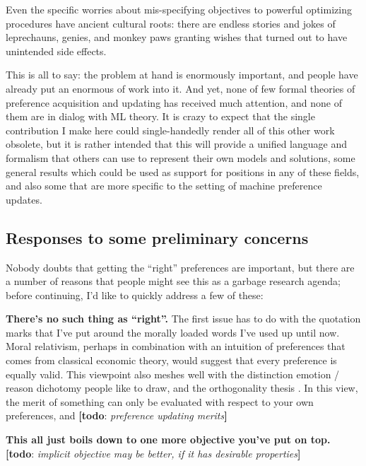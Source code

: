 \documentclass{article}
\theoremstyle{plain}
\theoremstyle{definition}
\theoremstyle{remark}
\newcommand{\todo}[1]{{\color{red}\large\textbf{[todo}: {\normalsize\itshape#1}\textbf{]}}}
\begin{document}
	
	Even the specific worries about mis-specifying objectives to powerful optimizing procedures have ancient cultural roots: there are endless stories and jokes of leprechauns, genies, and monkey paws granting wishes that turned out to have unintended side effects. 
	
	This is all to say: the problem at hand is enormously important, and people have already put an enormous of work into it. And yet, none of few formal theories of preference acquisition and updating has received much attention, and none of them are in dialog with ML theory. It is crazy to expect that the single contribution I make here could single-handedly render all of this other work obsolete, but it is rather intended that this will provide a unified language and formalism that others can use to represent their own models and solutions, some general results which could be used as support for positions in any of these fields, and also some that are more specific to the setting of machine preference updates.
		
	\subsection*{Responses to some preliminary concerns}
	Nobody doubts that getting the ``right'' preferences are important, but there are a number of reasons that people might see this as a garbage research agenda; before continuing, I'd like to quickly address a few of these:
	
	\textbf{There's no such thing as ``right''.} The first issue has to do with the quotation marks that I've put around the morally loaded words I've used up until now. Moral relativism, perhaps in combination with an intuition of preferences that comes from classical economic theory, would suggest that every preference is equally valid. This viewpoint also meshes well with the distinction emotion / reason dichotomy people like to draw, and the orthogonality thesis \cite{bostrom2012superintelligent}. In this view, the merit of something can only be evaluated with respect to your own preferences, and \todo{preference updating merits}
	
	
	
	\textbf{This all just boils down to one more objective you've put on top.} \todo{implicit objective may be better, if it has desirable properties}
	
\end{document}
